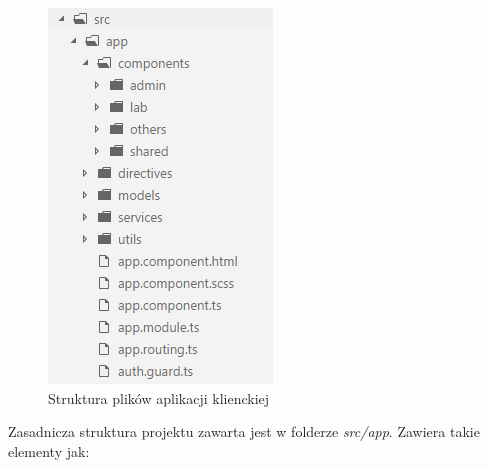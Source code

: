         \begin{figure}
        \includegraphics[width=1\linewidth]{graphics/chapter-4/client-structure.png}
        \caption{Struktura plików aplikacji klienckiej}
        \label{fig:client-structure}
        \end{figure}
            Zasadnicza struktura projektu zawarta jest w folderze \textit{src/app}. Zawiera takie elementy jak:
